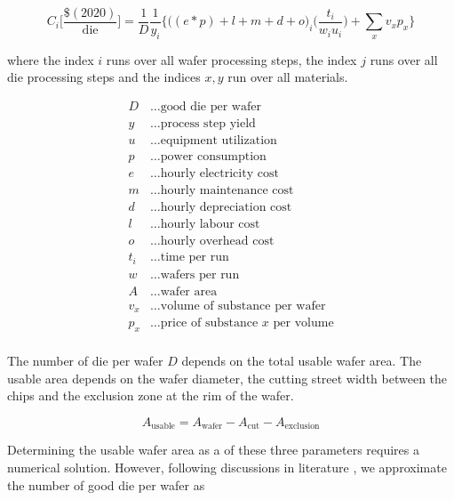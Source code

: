 \documentclass[10pt]{article}
\begin{document}
\begin{equation}
\label{eqn:cost_wafer}
    C_i \bigg[ \frac{ \$(2020) }{ \text{die} } \bigg] =\frac{1}{D}  \frac{1}{y_i}   \bigg\{ \bigg((e*p) + l + m + d +o \bigg)_i \bigg( \frac{t_i}{w_i u_i} \bigg) + \sum_{x} v_x p_x \bigg\}
\end{equation}

where the index $i$ runs over all wafer processing steps, the index $j$ runs over all die processing steps and the indices $x,y$ run over all materials.

\begin{align*}
        D &\dots \text{good die per wafer} \label{def:cost_wafer_first} \\
        y &\dots \text{process step yield} \\
        u &\dots \text{equipment utilization} \\
        p &\dots \text{power consumption} \\
        e &\dots \text{hourly electricity cost} \\
        m &\dots \text{hourly maintenance cost} \\
        d &\dots \text{hourly depreciation cost}\\
        l &\dots \text{hourly labour cost} \\
        o &\dots \text{hourly overhead cost} \\
        t_i &\dots \text{time per run} \\
        w &\dots \text{wafers per run} \\
        A &\dots \text{wafer area} \\
        v_x &\dots \text{volume of substance per wafer} \\
        p_x &\dots \text{price of substance $x$ per volume}\\
\end{align*}

The number of die per wafer $D$ depends on the total usable wafer area. The usable area depends on the wafer diameter, the cutting street width between the chips and the exclusion zone at the rim of the wafer.

\begin{equation}
	A_{\text{usable}}=A_{\text{wafer}}-A_{\text{cut}}-A_{\text{exclusion}}
\end{equation}

Determining the usable wafer area as a of these three parameters requires a numerical solution. However, following discussions in literature \cite{de2005investigation}, we approximate the number of good die per wafer as
\end{document}
